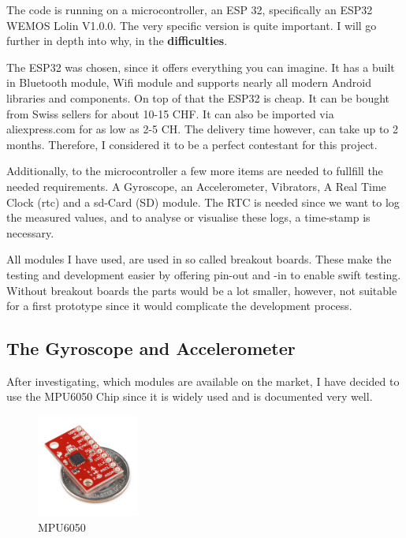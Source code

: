The code is running on a \gls{microcontroller}, an ESP 32, specifically an ESP32 WEMOS Lolin V1.0.0. The very specific version is quite important. I will go further in depth into why, in the \textbf{difficulties}.

The \gls{ESP32} was chosen, since it offers everything you can imagine. It has a built in Bluetooth module, Wifi module and supports nearly all modern Android libraries and components. On top of that the ESP32 is cheap. It can be bought from Swiss sellers for about 10-15 CHF. It can also be imported via aliexpress.com for as low as 2-5 CH. The delivery time however, can take up to 2 months. Therefore, I considered it to be a perfect contestant for this project. 

Additionally, to the microcontroller a few more items are needed to fullfill the needed requirements. A Gyroscope, an Accelerometer, Vibrators, A Real Time Clock (\acrshort{rtc}) and a \acrshort{sd}-Card (\gls{SD}) module. The \gls{RTC} is needed since we want to log the measured values, and to analyse or visualise these logs, a time-stamp is necessary. 

All modules I have used, are used in so called breakout boards. These make the testing and development easier by offering pin-out and -in to enable swift testing. Without breakout boards the parts would be a lot smaller, however, not suitable for a first prototype since it would complicate the development process.

\subsection{The Gyroscope and Accelerometer}

After investigating, which modules are available on the market, I have decided to use the 
\gls{MPU6050} Chip since it is widely used and is documented very well. 

\begin{figure}
  \begin{center}
\includegraphics[width=0.3\textwidth]{images/MPU_6050.jpg}

  \end{center}
  \caption{MPU6050}
  \label{fig:MPU6050}
\end{figure}

